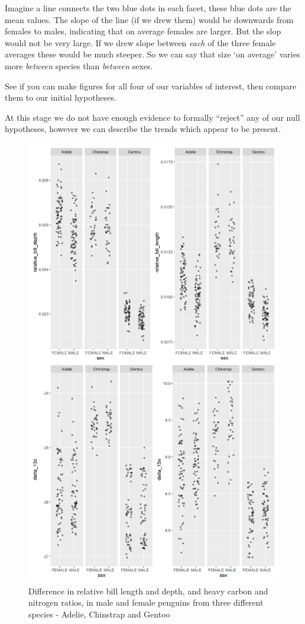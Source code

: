 \documentclass[
]{book}
\begin{document}
Imagine a line connects the two blue dots in each facet, these blue dots are the mean values. The slope of the line (if we drew them) would be downwards from females to males, indicating that on average females are larger. But the slop would not be very large. If we drew slope between \emph{each} of the three female averages these would be much steeper. So we can say that size `on average' varies more \emph{between} species than \emph{between} sexes.

See if you can make figures for all four of our variables of interest, then compare them to our initial hypotheses.

At this stage we do not have enough evidence to formally ``reject'' any of our null hypotheses, however we can describe the trends which appear to be present.

\begin{figure}
\includegraphics[width=0.8\linewidth]{images/summary} \caption{Difference in relative bill length and depth, and heavy carbon and nitrogen ratios, in male and female penguins from three different species - Adelie, Chinstrap and Gentoo}\label{fig:unnamed-chunk-111}
\end{figure}
\end{document}
